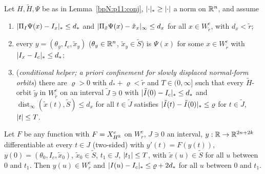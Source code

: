 \begin{lemma}\label{bpN:p11:transfer}
Let $H,\tilde H,\Psi$ be as in Lemma~\ref{bpN:p11:conj}, $\lvert \cdot\rvert_*\ge\lvert \cdot\rvert$ a norm on $\mathbb{R}^n$, and assume
\begin{enumerate}[label=(T\arabic*)]
\item $\lvert \Pi_I\Psi(x)-I_x\rvert_*\le d_*$ and $\lvert \Pi_{\tilde x}\Psi(x)-\tilde x_x\rvert_\infty\le d_x$ for all $x\in W^e_{\tilde r}$, with $d_x<\tilde r$;
\item every $y=(\theta_y,I_c,\tilde x_y)$ ($\theta_y\in\mathbb{R}^n$, $\tilde x_y\in\tilde S$) is $\Psi(x)$ for some $x\in W^e_{\tilde r}$ with $\lvert I_x-I_c\rvert_*\le d_*$;
\item (\emph{conditional helper; a priori confinement for slowly displaced normal-form orbits}) there are $\varrho>0$ with $d_*+\varrho<\tilde r$ and $T\in(0,\infty]$ such that every $\tilde H$-orbit $\tilde y$ in $W^e_{\tilde r}$ on an interval $\tilde J\ni0$ with $\lvert \tilde I(0)-I_c\rvert_*\le d_*$ and $\operatorname{dist}_\infty(\tilde x(t),\tilde S)\le d_x$ for all $t\in\tilde J$ satisfies $\lvert \tilde I(t)-\tilde I(0)\rvert_*\le\varrho$ for $t\in\tilde J$, $\lvert t\rvert\le T$.
\end{enumerate}
Let $F$ be any function with $F=X^c_{H^{\mathbb{R}}}$ on $W^e_r$, $J\ni0$ an interval, $y:\mathbb{R}\to\mathbb{R}^{2n+2k}$ differentiable at every $t\in J$ (two-sided) with $y'(t)=F(y(t))$, $y(0)=(\theta_0,I_c,\tilde x_0)$, $\tilde x_0\in\tilde S$, $t_1\in J$, $\lvert t_1\rvert\le T$, with $\tilde x(u)\in\tilde S$ for all $u$ between $0$ and $t_1$. Then $y(u)\in W^e_r$ and $\lvert I(u)-I_c\rvert_*\le\varrho+2d_*$ for all $u$ between $0$ and $t_1$.
\end{lemma}
